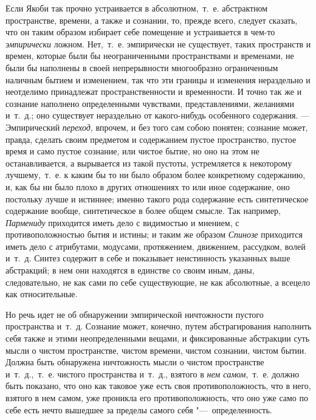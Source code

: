 Если Якоби так прочно устраивается в абсолютном,~т.~е. абстрактном
пространстве, времени, а также и сознании, то, прежде всего, следует
сказать, что он таким образом избирает себе помещение и устраивается в
чем-то {\em эмпирически} ложном. Нет,~т.~е. эмпирически
не существует, таких пространств и времен, которые были бы неограниченными
пространствами и временами, не были бы наполнены в своей непрерывности
многообразно ограниченным наличным бытием и изменением, так что эти границы
и изменения нераздельно и неотделимо принадлежат пространственности и
временности. И точно так же и сознание наполнено определенными чувствами,
представлениями, желаниями и~т.~д.; оно существует нераздельно от
какого-нибудь особенного содержания. --- Эмпирический
{\em переход}, впрочем, и без того сам собою понятен;
сознание может, правда, сделать своим предметом и содержанием пустое
пространство, пустое время и само пустое сознание, или чистое бытие, но оно
на этом не останавливается, а вырывается из такой пустоты, устремляется к
некоторому лучшему,~т.~е. к каким бы то ни было образом более конкретному
содержанию, и, как бы ни было плохо в других отношениях то или иное
содержание, оно постольку лучше и истиннее; именно такого рода содержание
есть синтетическое содержание вообще, синтетическое в более общем смысле.
Так например, {\em Пармениду} приходится иметь дело с
видимостью и мнением, с противоположностью бытия и истины; и таким же
образом {\em Спинозе} приходится иметь дело с
атрибутами, модусами, протяжением, движением, рассудком, волей и~т.~д.
Синтез содержит в себе и показывает неистинность указанных выше абстракций;
в нем они находятся в единстве со своим иным, даны, следовательно, не как
сами по себе существующие, не как абсолютные, а всецело как относительные.

Но речь идет не об обнаружении эмпирической ничтожности пустого пространства
и~т.~д. Сознание может, конечно, путем абстрагирования наполнить себя также
и этими неопределенными вещами, и фиксированные абстракции суть мысли о
чистом пространстве, чистом времени, чистом сознании, чистом бытии. Должна
быть обнаружена ничтожность мысли о чистом пространстве и~т.~д.,~т.~е.
чистого пространства и~т.~д., взятого в {\em нем
самом},~т.~е. должно быть показано, что оно как таковое уже есть своя
противоположность, что в него, взятого в нем самом, уже проникла его
противоположность, что оно уже само по себе есть нечто вышедшее за пределы
самого себя "---~определенность.

